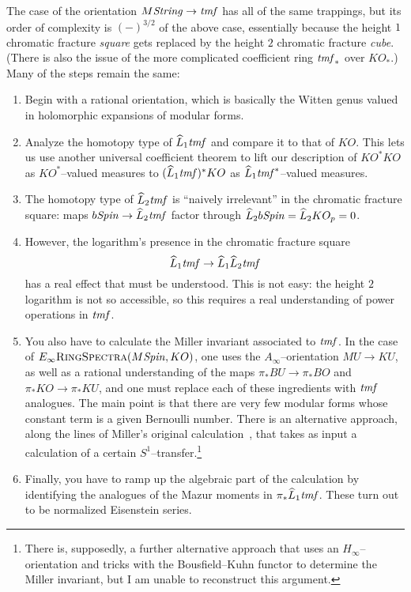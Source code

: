 The case of the orientation $M\mathit{String} \to \mathit{tmf}$ has all of the same trappings, but its order of complexity is $(-)^{3/2}$ of the above case, essentially because the height $1$ chromatic fracture \emph{square} gets replaced by the height $2$ chromatic fracture \emph{cube}.  (There is also the issue of the more complicated coefficient ring $\mathit{tmf}_*$ over $KO_*$.)  Many of the steps remain the same:
\begin{enumerate}
    \item Begin with a rational orientation, which is basically the Witten genus valued in holomorphic expansions of modular forms.
    \item Analyze the homotopy type of $\widehat L_1 \mathit{tmf}$ and compare it to that of $KO$.  This lets us use another universal coefficient theorem to lift our description of $KO^* KO$ as $KO^*$--valued measures to $(\widehat L_1 \mathit{tmf})^* KO$ as $\widehat L_1 \mathit{tmf}^*$--valued measures.
    \item The homotopy type of $\widehat L_2 \mathit{tmf}$ is ``naively irrelevant'' in the chromatic fracture square: maps $b\mathit{Spin} \to \widehat L_2 \mathit{tmf}$ factor through $\widehat L_2 b\mathit{Spin} = \widehat L_2 KO_p = 0$.
    \item However, the logarithm's presence in the chromatic fracture square \[\widehat L_1 \mathit{tmf} \to \widehat L_1 \widehat L_2 \mathit{tmf}\] has a real effect that must be understood.  This is not easy: the height $2$ logarithm is not so accessible, so this requires a real understanding of power operations in $\mathit{tmf}$.
    \item You also have to calculate the Miller invariant associated to $\mathit{tmf}$.  In the case of $E_\infty\normalfont\textsc{RingSpectra}(M\mathit{Spin}, KO)$, one uses the $A_\infty$--orientation $MU \to KU$, as well as a rational understanding of the maps $\pi_* BU \to \pi_* BO$ and $\pi_* KO \to \pi_* KU$, and one must replace each of these ingredients with $\mathit{tmf}$ analogues.  The main point is that there are very few modular forms whose constant term is a given Bernoulli number.  There is an alternative approach, along the lines of Miller's original calculation~\cite{MillerBernoulliNos}, that takes as input a calculation of a certain $S^1$--transfer.\footnote{There is, supposedly, a further alternative approach that uses an $H_\infty$--orientation and tricks with the Bousfield--Kuhn functor to determine the Miller invariant, but I am unable to reconstruct this argument.}
    \item Finally, you have to ramp up the algebraic part of the calculation by identifying the analogues of the Mazur moments in $\pi_* \widehat L_1 \mathit{tmf}$.  These turn out to be normalized Eisenstein series.
\end{enumerate}









